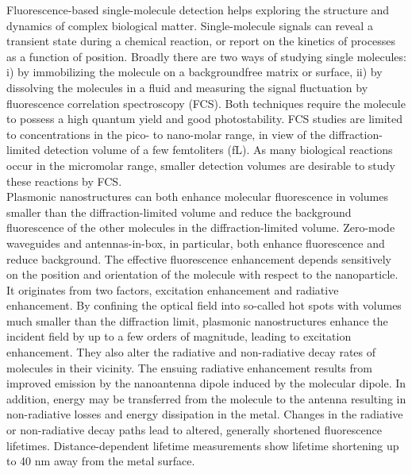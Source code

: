 \documentclass[journal=jacsat,manuscript=article]{achemso}
\begin{document}
Fluorescence-based single-molecule detection helps exploring the structure and dynamics of complex biological matter.\cite{moerner1999illuminating,weiss1999fluorescence} Single-molecule signals can reveal a transient state during a chemical reaction, or report on the kinetics of processes as a function of position. Broadly there are two ways of studying single molecules: i) by immobilizing the molecule on a backgroundfree matrix or surface, ii) by dissolving the molecules in a fluid and measuring the signal fluctuation by fluorescence correlation spectroscopy (FCS).\cite{Magde1972} Both techniques require the molecule to possess a high quantum yield and good photostability. FCS studies are limited to concentrations in the pico- to nano-molar range, in view of the diffraction-limited detection volume of a few femtoliters (fL). As many biological reactions occur in the micromolar range\cite{craighead2006future}, smaller detection volumes are desirable to study these reactions by FCS.\\

Plasmonic nanostructures can both enhance molecular fluorescence in volumes smaller than the diffraction-limited volume and reduce the background fluorescence of the other molecules in the diffraction-limited volume. Zero-mode waveguides and antennas-in-box, in particular, both enhance fluorescence and reduce background.\cite{levene2003zeromode,kinkhabwala2012fluorescence,punj2013a,yuan2013thousandfold,punj2013gold} The effective fluorescence enhancement depends sensitively on the position and orientation of the molecule with respect to the nanoparticle. It originates from two factors, excitation enhancement and radiative enhancement. By confining the optical field into so-called hot spots with volumes much smaller than the diffraction limit,\cite{schuller2010plasmonics} plasmonic nanostructures enhance the incident field by up to a few orders of magnitude, leading to excitation enhancement.\cite{yuan2013thousandfold,anger2006enhancement,kinkhabwala2009large,acuna2012fluorescence,busson2012accelerated,holzmeister2014quantum,khatua2014resonant} They also alter the radiative and non-radiative decay rates of molecules in their vicinity. The ensuing radiative enhancement results from improved emission by the nanoantenna dipole induced by the molecular dipole. In addition, energy may be transferred from the molecule to the antenna resulting in non-radiative losses and energy dissipation in the metal. Changes in the radiative or non-radiative decay paths lead to altered, generally shortened fluorescence lifetimes.\cite{khatua2014resonant,liu2007quantized,lakowicz2001radiative,dulkeith2005gold,seelig2007nanoparticleinduced,muskens2007strong,pelton2015modified} Distance-dependent lifetime measurements show lifetime shortening up to 40 nm away from the metal surface.\cite{seelig2007nanoparticleinduced}\\
\end{document}
